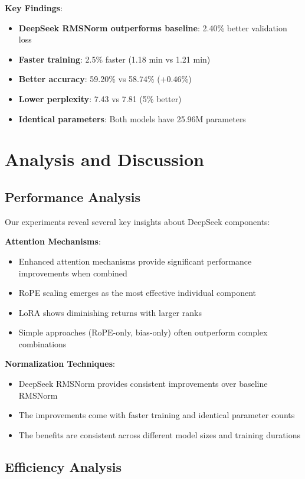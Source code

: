 \documentclass[11pt,a4paper]{article}
\begin{document}
\textbf{Key Findings}:
\begin{itemize}
    \item \textbf{DeepSeek RMSNorm outperforms baseline}: 2.40\% better validation loss
    \item \textbf{Faster training}: 2.5\% faster (1.18 min vs 1.21 min)
    \item \textbf{Better accuracy}: 59.20\% vs 58.74\% (+0.46\%)
    \item \textbf{Lower perplexity}: 7.43 vs 7.81 (5\% better)
    \item \textbf{Identical parameters}: Both models have 25.96M parameters
\end{itemize}

\section{Analysis and Discussion}

\subsection{Performance Analysis}

Our experiments reveal several key insights about DeepSeek components:

\textbf{Attention Mechanisms}:
\begin{itemize}
    \item Enhanced attention mechanisms provide significant performance improvements when combined
    \item RoPE scaling emerges as the most effective individual component
    \item LoRA shows diminishing returns with larger ranks
    \item Simple approaches (RoPE-only, bias-only) often outperform complex combinations
\end{itemize}

\textbf{Normalization Techniques}:
\begin{itemize}
    \item DeepSeek RMSNorm provides consistent improvements over baseline RMSNorm
    \item The improvements come with faster training and identical parameter counts
    \item The benefits are consistent across different model sizes and training durations
\end{itemize}

\subsection{Efficiency Analysis}
\end{document}
